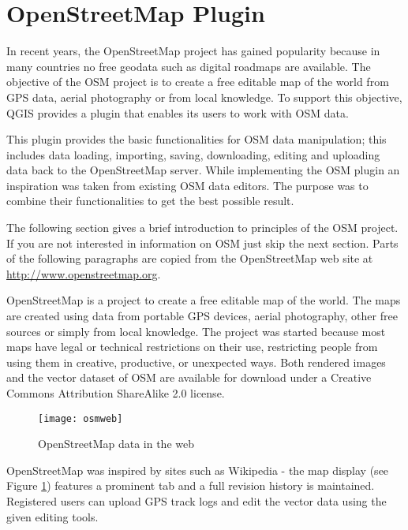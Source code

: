 
\section{OpenStreetMap Plugin}\label{plugins_osm}


In recent years, the OpenStreetMap project has gained popularity because in many countries no free geodata such as digital roadmaps are available.
The objective of the OSM project is to create a free editable map of the world from GPS data, aerial photography or from local knowledge. To
support this objective, QGIS provides a plugin that enables its users to work with OSM data.

This plugin provides the basic functionalities for OSM data manipulation; this includes data loading, importing, saving, downloading, editing and
uploading data back to the OpenStreetMap server. While implementing the OSM plugin an inspiration was taken from existing OSM data editors. The
purpose was to combine their functionalities to get the best possible result.

The following section gives a brief introduction to principles of the OSM project. If you are not interested in information on OSM just skip the next
section. Parts of the following paragraphs are copied from the OpenStreetMap web site at \url{http://www.openstreetmap.org}.


OpenStreetMap is a project to create a free editable map of the world. The maps are created using data from portable GPS devices, aerial photography,
other free sources or simply from local knowledge. The project was started because most maps have legal or technical restrictions on their use, restricting people from using them in creative, productive, or unexpected ways. Both rendered images and the vector dataset of OSM are available for download under a Creative Commons Attribution ShareAlike 2.0 license.

\begin{figure}[ht]
   \centering
   \texttt{[image: osmweb]}
   \caption{OpenStreetMap data in the web \nixcaption}\label{fig:osmweb}
\end{figure}

OpenStreetMap was inspired by sites such as Wikipedia - the map display
(see Figure \ref{fig:osmweb}) features a prominent  tab and a
full revision history is maintained. Registered users can upload GPS track
logs and edit the vector data using the given editing tools.

